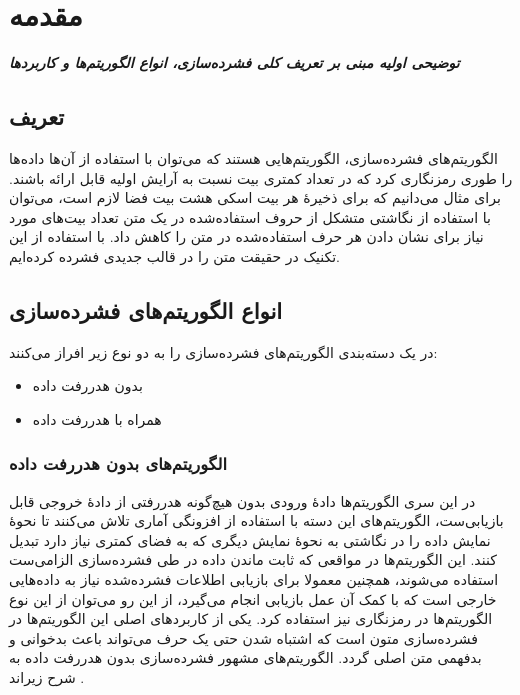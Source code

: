 \chapter{مقدمه}
\noindent
\textbf{
	\textit{
		توضیحی اولیه مبنی بر تعریف کلی فشرده‌سازی، انواع الگوریتم‌ها و کاربردها
	}
}
\pagebreak
\section{تعریف}

الگوریتم‌های فشرده‌سازی، الگوریتم‌هایی هستند که می‌توان با استفاده از آن‌ها داده‌ها را طوری رمزنگاری کرد که در تعداد 	کمتری بیت نسبت به آرایش اولیه
قابل ارائه باشند\cite{data_compression}.
برای مثال می‌دانیم که برای ذخیرهٔ هر بیت اسکی
 هشت بیت فضا لازم است، می‌توان با استفاده از نگاشتی متشکل از حروف استفاده‌شده در 
یک متن تعداد بیت‌های مورد نیاز برای نشان دادن هر حرف استفاده‌شده در متن را کاهش داد.
با استفاده از این تکنیک در حقیقت متن را در قالب جدیدی فشرده کرده‌ایم.

\section{انواع الگوریتم‌های فشرده‌سازی}

در یک دسته‌بندی الگوریتم‌های فشرده‌سازی را به دو نوع زیر افراز می‌کنند:
\begin{itemize}
	\item  بدون هدررفت داده 
	\item  همراه با هدررفت داده 
\end{itemize}

\subsection{الگوریتم‌های بدون هدررفت داده}
در این سری الگوریتم‌ها دادهٔ ورودی بدون هیچ‌گونه هدررفتی از دادهٔ خروجی قابل بازیابی‌ست، الگوریتم‌های 
این دسته با استفاده از افزونگی آماری تلاش می‌کنند تا نحوهٔ نمایش داده را در نگاشتی به نحوهٔ نمایش دیگری که به فضای کمتری نیاز دارد 
تبدیل کنند.
این الگوریتم‌ها در مواقعی که 
ثابت ماندن داده در طی فشرده‌سازی الزامی‌ست استفاده می‌شوند، همچنین معمولا برای بازیابی اطلاعات فشرده‌شده نیاز به 
داده‌هایی خارجی است که با کمک آن عمل بازیابی انجام می‌گیرد، از این رو می‌توان از این نوع الگوریتم‌ها در رمزنگاری نیز 
استفاده کرد. یکی از کاربردهای اصلی این الگوریتم‌ها در فشرده‌سازی متون است که اشتباه شدن حتی یک حرف می‌تواند باعث بدخوانی و 
بدفهمی متن اصلی گردد. الگوریتم‌های مشهور فشرده‌سازی بدون هدررفت داده به شرح زیراند \cite{data_types}.

